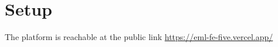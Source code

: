 \section{Setup}
The platform is reachable at the public link \href{https://eml-fe-five.vercel.app/}{https://eml-fe-five.vercel.app/}